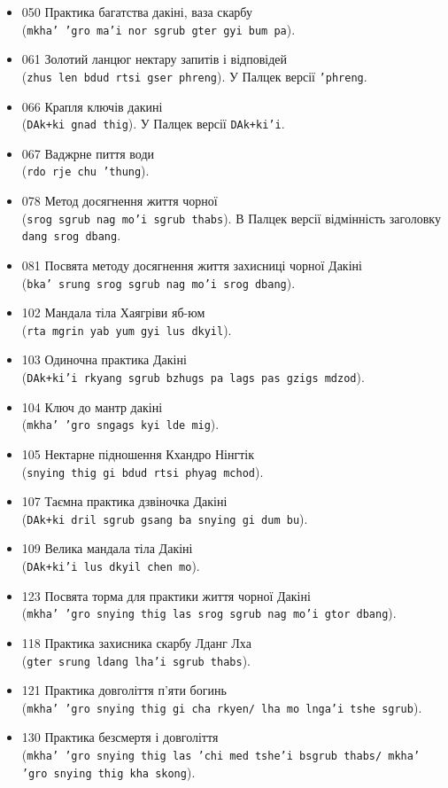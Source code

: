 \documentclass{article}
\begin{document}
\begin{itemize}
\item 050 Практика багатства дакіні, ваза скарбу \\ (\texttt{mkha' 'gro ma'i nor sgrub gter gyi bum pa}).
\item 061 Золотий ланцюг нектару запитів і відповідей \\ (\texttt{zhus len bdud rtsi gser phreng}). У Палцек версії \texttt{'phreng}.
\item 066 Крапля ключів дакині \\ (\texttt{DAk+ki gnad thig}). У Палцек версії \texttt{DAk+ki'i}.
\item 067 Ваджрне пиття води \\ (\texttt{rdo rje chu 'thung}).
\item 078 Метод досягнення життя чорної \\ (\texttt{srog sgrub nag mo'i sgrub thabs}). В Палцек версії відмінність заголовку \texttt{dang srog dbang}.
\item 081 Посвята методу досягнення життя захисниці чорної Дакіні \\ (\texttt{bka' srung srog sgrub nag mo'i srog dbang}).
\item 102 Мандала тіла Хаягріви яб-юм \\ (\texttt{rta mgrin yab yum gyi lus dkyil}).
\item 103 Одиночна практика Дакіні \\ (\texttt{DAk+ki'i rkyang sgrub bzhugs pa lags pas gzigs mdzod}).
\item 104 Ключ до мантр дакіні \\ (\texttt{mkha' 'gro sngags kyi lde mig}).
\item 105 Нектарне підношення Кхандро Нінгтік \\ (\texttt{snying thig gi bdud rtsi phyag mchod}).
\item 107 Таємна практика дзвіночка Дакіні \\ (\texttt{DAk+ki dril sgrub gsang ba snying gi dum bu}).
\item 109 Велика мандала тіла Дакіні \\ (\texttt{DAk+ki'i lus dkyil chen mo}).
\item 123 Посвята торма для практики життя чорної Дакіні \\ (\texttt{mkha' 'gro snying thig las srog sgrub nag mo'i gtor dbang}).
\item 118 Практика захисника скарбу Лданг Лха \\ (\texttt{gter srung ldang lha'i sgrub thabs}).
\item 121 Практика довголіття п'яти богинь \\ (\texttt{mkha' 'gro snying thig gi cha rkyen/ lha mo lnga'i tshe sgrub}).
\item 130 Практика безсмертя і довголіття \\ (\texttt{mkha' 'gro snying thig las 'chi med tshe'i bsgrub thabs/ mkha' 'gro snying thig kha skong}).
\end{itemize}
\endgroup
\end{document}
